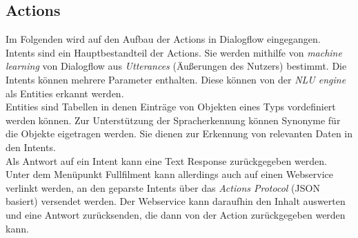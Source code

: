 \subsection{Actions}

Im Folgenden wird auf den Aufbau der Actions in Dialogflow eingegangen.\\
Intents sind ein Hauptbestandteil der Actions. Sie werden mithilfe von \textit{machine learning} von Dialogflow aus \textit{Utterances} (Äußerungen des Nutzers) bestimmt. Die Intents können mehrere Parameter enthalten. Diese können von der \textit{NLU engine} als Entities erkannt werden.\\
Entities sind Tabellen in denen Einträge von Objekten eines Typs vordefiniert werden können.
Zur Unterstützung der Spracherkennung können Synonyme für die Objekte eigetragen werden.
Sie dienen zur Erkennung von relevanten Daten in den Intents.\\
Als Antwort auf ein Intent kann eine Text Response zurückgegeben werden. Unter dem Menüpunkt Fullfilment kann allerdings auch auf einen Webservice verlinkt werden, an den geparste Intents über das \textit{Actions Protocol} (JSON basiert) versendet werden. Der Webservice kann daraufhin den Inhalt auswerten und eine Antwort zurücksenden, die dann von der Action zurückgegeben werden kann.